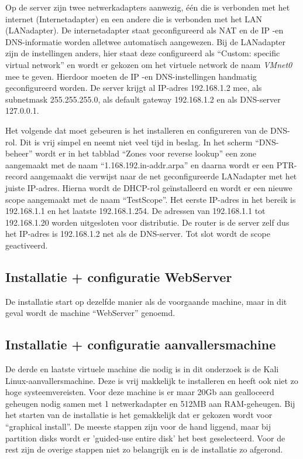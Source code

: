 \documentclass[pdftex,a4paper,12pt]{report}
\begin{document}
Op de server zijn twee netwerkadapters aanwezig, één die is verbonden met het internet (Internetadapter) en een andere die is verbonden met het LAN (LANadapter). De internetadapter staat geconfigureerd als NAT en de IP -en DNS-informatie worden alletwee automatisch aangewezen. Bij de LANadapter zijn de instellingen anders, hier staat deze configureerd als "`Custom: specific virtual network"' en wordt er gekozen om het virtuele network de naam \textit{VMnet0} mee te geven. Hierdoor moeten de IP -en DNS-instellingen handmatig geconfigureerd worden. De server krijgt al IP-adres 192.168.1.2 mee, als subnetmask 255.255.255.0, als default gateway 192.168.1.2 en als DNS-server 127.0.0.1. \newline

Het volgende dat moet gebeuren is het installeren en configureren van de DNS-rol. Dit is vrij simpel en neemt niet veel tijd in beslag. In het scherm "`DNS-beheer"' wordt er in het tabblad "`Zones voor reverse lookup"' een zone aangemaakt met de naam "`1.168.192.in-addr.arpa"' en daarna wordt er een PTR-record aangemaakt die verwijst naar de net geconfigureerde LANadapter met het juiste IP-adres. Hierna wordt de DHCP-rol geïnstalleerd en wordt er een nieuwe scope aangemaakt met de naam "`TestScope"'. Het eerste IP-adres in het bereik is 192.168.1.1 en het laatste 192.168.1.254. De adressen van 192.168.1.1 tot 192.168.1.20 worden uitgesloten voor distributie. De router is de server zelf dus het IP-adres is 192.168.1.2 net als de DNS-server. Tot slot wordt de scope geactiveerd. \newline

\subsection{Installatie + configuratie WebServer}
De installatie start op dezelfde manier als de voorgaande machine, maar in dit geval wordt de machine "`WebServer"' genoemd.

\subsection{Installatie + configuratie aanvallersmachine}
De derde en laatste virtuele machine die nodig is in dit onderzoek is de Kali Linux-aanvallersmachine. Deze is vrij makkelijk te installeren en heeft ook niet zo hoge systeemvereisten. Voor deze machine is er maar 20Gb aan gealloceerd geheugen nodig samen met 1 netwerkadapter en 512MB aan RAM-geheugen. Bij het starten van de installatie is het gemakkelijk dat er gekozen wordt voor "`graphical install"'. De meeste stappen zijn voor de hand liggend, maar bij partition disks wordt er 'guided-use entire disk' het best geselecteerd. Voor de rest zijn de overige stappen niet zo belangrijk en is de installatie zo afgerond.
\end{document}
